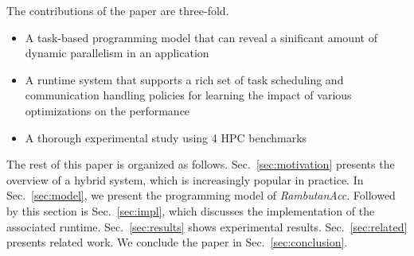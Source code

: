 The contributions of the paper are three-fold.
\begin{itemize}
\item A task-based programming model that can reveal a sinificant amount of dynamic parallelism in an application
\item A runtime system that supports a rich set of task scheduling and communication handling policies for learning the impact of various optimizations on the performance
\item A thorough experimental study using 4 HPC benchmarks 
\end{itemize}

The rest of this paper is organized as follows.
Sec.~\ref{sec:motivation} presents the overview of a hybrid system, which is increasingly popular in practice.
In Sec.~\ref{sec:model}, we present the programming model of {\em RambutanAcc}.
Followed by this section is Sec.~\ref{sec:impl}, which discusses the implementation of the associated runtime.
Sec.~\ref{sec:results} shows experimental results.
Sec.~\ref{sec:related} presents related work.
We conclude the paper in Sec.~\ref{sec:conclusion}.
